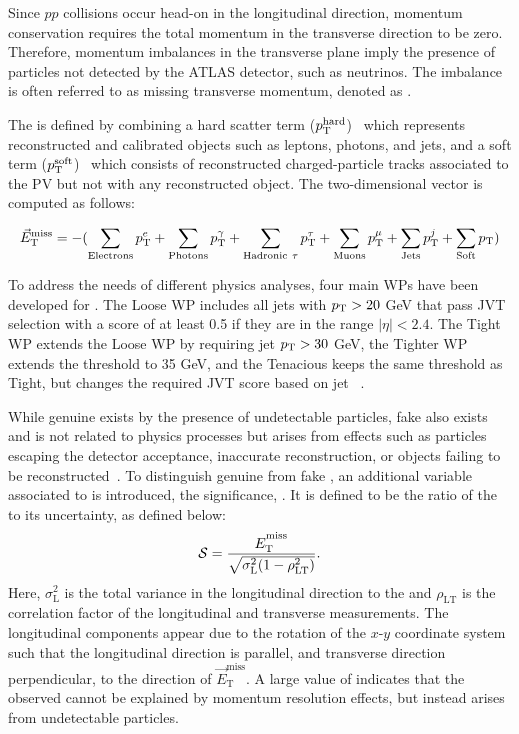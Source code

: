 Since $pp$ collisions occur head-on in the longitudinal direction, momentum conservation requires the total momentum in the transverse direction to be zero. Therefore, momentum imbalances in the transverse plane imply the presence of particles not detected by the ATLAS detector, such as neutrinos. The imbalance is often referred to as missing transverse momentum, denoted as \met{}. 

The \met{} is defined by combining a hard scatter term ($p_{\mathrm{T}}^{\mathrm{hard}}$)~\cite{ATLAS:2018ghb} which represents reconstructed and calibrated objects such as leptons, photons, and jets, and a soft term ($p_{\mathrm{T}}^{\mathrm{soft}}$)~\cite{met_soft_term} which consists of reconstructed charged-particle tracks associated to the PV but not with any reconstructed object. The \met{} two-dimensional vector is computed as follows:

\begin{equation}
  \centering
  \vec{E}_{\mathrm{T}}^{\mathrm{miss}} = - (\sum_{\mathrm{Electrons}}{\pt^{e}} + \sum_{\mathrm{Photons}}{\pt^{\gamma}} + \sum_{\mathrm{Hadronic~} \tau}{\pt^{\tau}} + \sum_{\mathrm{Muons}}{\pt^{\mu}} + \sum_{\mathrm{Jets}}{\pt^{j}} + \sum_{\mathrm{Soft}}{\pt})
  \label{eq:met_calculation}
\end{equation}

To address the needs of different physics analyses, four main WPs have been developed for \met{}. The Loose WP includes all jets with $p_{\mathrm{T}} > 20$ GeV that pass JVT selection with a score of at least 0.5 if they are in the range $|\eta| < 2.4$. The Tight WP extends the Loose WP by requiring jet $p_{\mathrm{T}} > 30$ GeV, the Tighter WP extends the \pt{} threshold to 35 GeV, and the Tenacious keeps the same \pt{} threshold as Tight, but changes the required JVT score based on jet \pt{}~\cite{ATLAS:2018ghb}.

While genuine \met{} exists by the presence of undetectable particles, fake \met{} also exists and is not related to physics processes but arises from effects such as particles escaping the detector acceptance, inaccurate reconstruction, or objects failing to be reconstructed~\cite{ATLAS:2018uid}. To distinguish genuine \met{} from fake \met{}, an additional variable associated to \met{} is introduced, the \met{} significance, \metsig{}. It is defined to be the ratio of the \met{} to its uncertainty, as defined below:
\begin{equation}
  \centering
  \metsig = \frac{\met}{\sqrt{\sigma_{\mathrm{L}}^{2}(1 - \rho_{\mathrm{LT}}^{2})}}.
  \label{eq:met_sig_calc}
\end{equation}
Here, $\sigma_{\mathrm{L}}^2$ is the total variance in the longitudinal direction to the \met{} and $\rho_{\mathrm{LT}}$ is the correlation factor of the longitudinal and transverse measurements. The longitudinal components appear due to the rotation of the $x$-$y$ coordinate system such that the longitudinal direction is parallel, and transverse direction perpendicular, to the direction of $\vec{E}_{\mathrm{T}}^{\mathrm{miss}}$. A large value of \metsig{} indicates that the observed \met{} cannot be explained by momentum resolution effects, but instead arises from undetectable particles.